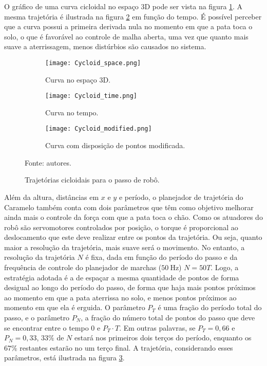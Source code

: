 \documentclass[conference]{IEEEtran}
\begin{document}
O gráfico de uma curva cicloidal no espaço 3D pode ser vista na figura \ref{fig:traj_space}. A mesma trajetória é ilustrada na figura \ref{fig:traj_time} em função do tempo. É possível perceber que a curva possui a primeira derivada nula no momento em que a pata toca o solo, o que é favorável ao controle de malha aberta, uma vez que quanto mais suave a aterrissagem, menos distúrbios são causados no sistema.

\begin{figure*}[h]
  \centering
  \begin{subfigure}[t]{0.32\textwidth}
    \centering
    \texttt{[image: Cycloid\_space.png]}
    \caption{Curva no espaço 3D.}
    \label{fig:traj_space}
  \end{subfigure}
  \begin{subfigure}[t]{0.32\textwidth}
    \centering
    \texttt{[image: Cycloid\_time.png]}
    \caption{Curva no tempo.}
    \label{fig:traj_time}
  \end{subfigure}
  \begin{subfigure}[t]{0.32\textwidth}
    \centering
    \texttt{[image: Cycloid\_modified.png]}
    \caption{Curva com disposição de pontos modificada.}
    \label{fig:traj_time_modified}
  \end{subfigure}
  \vfill
  \caption{Trajetórias cicloidais para o passo de robô.}
  Fonte: autores.
  \label{fig:traj_curve}
\end{figure*}

Além da altura, distâncias em $x$ e $y$ e período, o planejador de trajetória do Caramelo também conta com dois parâmetros que têm como objetivo melhorar ainda mais o controle da força com que a pata toca o chão. Como os atuadores do robô são servomotores controlados por posição, o torque é proporcional ao deslocamento que este deve realizar entre os pontos da trajetória. Ou seja, quanto maior a resolução da trajetória, mais suave será o movimento. No entanto, a resolução da trajetória $N$ é fixa, dada em função do período do passo e da frequência de controle do planejador de marchas ($\SI{50}{\hertz}$) $N = 50T$. Logo, a estratégia adotada é a de espaçar a mesma quantidade de pontos de forma desigual ao longo do período do passo, de forma que haja mais pontos próximos ao momento em que a pata aterrissa no solo, e menos pontos próximos ao momento em que ela é erguida. O parâmetro $P_T$ é uma fração do período total do passo, e o parâmetro $P_N$, a fração do número total de pontos do passo que deve se encontrar entre o tempo $0$ e $P_T \cdot T$. Em outras palavras, se $P_T = 0,66$ e $P_N = 0,33$, $33\%$ de $N$ estará nos primeiros dois terços do período, enquanto os $67\%$ restantes estarão no um terço final. A trajetória, considerando esses parâmetros, está ilustrada na figura \ref{fig:traj_time_modified}.
\end{document}
